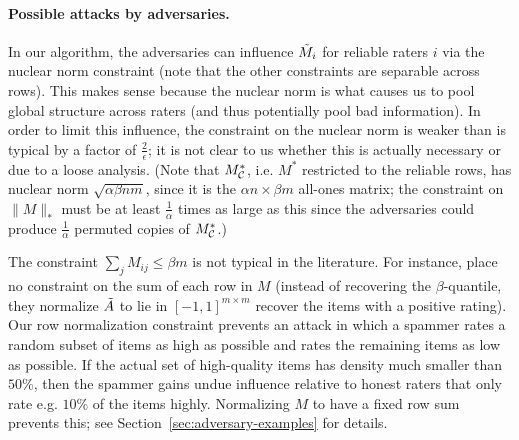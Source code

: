 \paragraph{Possible attacks by adversaries.} In our algorithm, 
the adversaries can influence $\tilde{M}_i$ for reliable raters $i$ via 
the nuclear norm constraint (note that the other constraints are 
separable across rows). This makes sense because 
the nuclear norm is what causes us to pool global structure across 
raters (and thus potentially pool bad information). In order to 
limit this influence, the constraint on the 
nuclear norm is weaker than is typical by a factor of $\frac{2}{\epsilon}$; 
it is not clear to us whether this is actually necessary or due to a 
loose analysis. (Note that $M_{\mathcal{C}}^*$, i.e. $M^*$ restricted to the 
reliable rows, 
has nuclear norm $\sqrt{\alpha\beta nm}$, since it is the 
$\alpha n \times \beta m$ all-ones matrix; the constraint on $\|M\|_*$ must 
be at least $\frac{1}{\alpha}$ times as large as this since the adversaries 
could produce $\frac{1}{\alpha}$ permuted copies of $M_{\mathcal{C}}^*$.)

The constraint $\sum_j M_{ij} \leq \beta m$ is 
not typical in the literature. For instance,  
place no 
constraint on the sum of each row in $M$ (instead of recovering 
the $\beta$-quantile, they normalize $\tilde{A}$ to lie in $[-1,1]^{m \times m}$ recover 
the items with a positive rating).
Our row normalization constraint prevents an attack 
in which a spammer rates a random subset of items as high as possible and 
rates the remaining items as low as possible. If the actual set of 
high-quality items has density much smaller than $50\%$, then the 
spammer gains undue influence relative to honest raters that 
only rate e.g. $10\%$ of the items highly. Normalizing $M$ to 
have a fixed row sum prevents this; see Section~\ref{sec:adversary-examples} 
for details.
